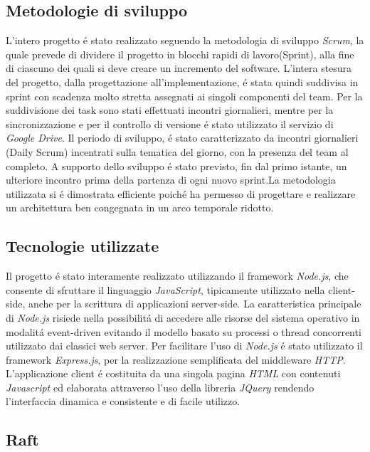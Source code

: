 \documentclass{sig-alternate-05-2015}
\begin{document}
\subsection{Metodologie di sviluppo}


L'intero progetto \'e stato realizzato seguendo la metodologia di sviluppo \textit{Scrum}, la quale prevede di dividere il progetto in blocchi rapidi di lavoro(Sprint), alla fine di ciascuno dei quali si deve creare un incremento del software. L'intera stesura del progetto, dalla progettazione all'implementazione, \'e stata quindi suddivisa in sprint con scadenza molto stretta assegnati ai singoli componenti del team. 
Per la suddivisione dei task sono stati effettuati incontri giornalieri, mentre per la sincronizzazione e per il controllo di versione \'e stato utilizzato il servizio di \textit{Google Drive}. Il periodo di sviluppo, \'e stato caratterizzato da incontri giornalieri (Daily Scrum) incentrati sulla tematica del giorno, con la presenza del team al completo. A supporto dello sviluppo \'e stato previsto, fin dal primo istante, un ulteriore incontro prima della partenza di ogni nuovo sprint.La metodologia utilizzata si \'e dimostrata efficiente poich\'e ha permesso di progettare e realizzare un architettura ben congegnata in un arco temporale ridotto.
\subsection{Tecnologie utilizzate}


Il progetto \'e stato interamente realizzato utilizzando il framework \textit{Node.js}, che consente di sfruttare il linguaggio \textit{JavaScript}, tipicamente utilizzato nella client-side, anche per la scrittura di applicazioni server-side. La caratteristica principale di \textit{Node.js} risiede nella possibilit\'a di accedere alle risorse del sistema operativo in modalit\'a event-driven evitando il modello basato su processi o thread concorrenti utilizzato dai classici web server. Per facilitare l'uso di \textit{Node.js} \'e stato utilizzato il framework \textit{Express.js}, per la realizzazione semplificata del middleware \textit{HTTP}.
 L'applicazione client \'e costituita da una singola pagina \textit{HTML} con contenuti \textit{Javascript} ed elaborata attraverso l'uso della libreria \textit{JQuery} rendendo l'interfaccia dinamica e consistente e di facile utilizzo. 

\subsection{Raft}
\end{document}
